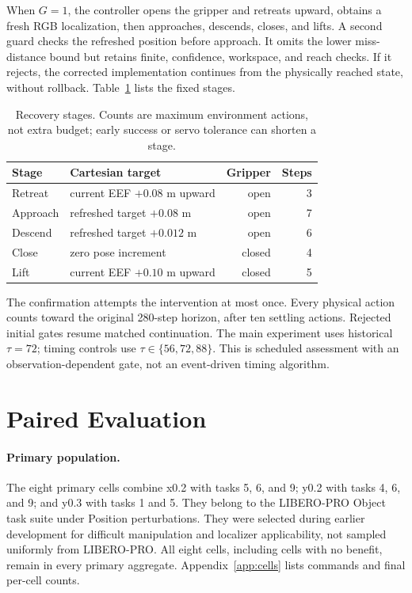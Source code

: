 \documentclass{article}
\begin{document}
When $G=1$, the controller opens the gripper and retreats upward, obtains
a fresh RGB localization, then approaches, descends, closes, and lifts.
A second guard checks the refreshed position before approach.
It omits the lower miss-distance bound but retains finite, confidence,
workspace, and reach checks. If it rejects, the corrected implementation
continues from the physically reached state, without rollback.
Table~\ref{tab:primitive} lists the fixed stages.

\begin{table}[t]
\caption{Recovery stages. Counts are maximum environment actions, not extra
budget; early success or servo tolerance can shorten a stage.}
\label{tab:primitive}
\centering\small
\begin{tabular}{llrr}
\toprule
Stage & Cartesian target & Gripper & Steps\\
\midrule
Retreat & current EEF $+0.08$ m upward & open & 3\\
Approach & refreshed target $+0.08$ m & open & 7\\
Descend & refreshed target $+0.012$ m & open & 6\\
Close & zero pose increment & closed & 4\\
Lift & current EEF $+0.10$ m upward & closed & 5\\
\bottomrule
\end{tabular}
\end{table}

The confirmation attempts the intervention at most once.
Every physical action counts toward the original 280-step horizon, after
ten settling actions. Rejected initial gates resume matched continuation.
The main experiment uses historical $\tau=72$; timing controls use
$\tau\in\{56,72,88\}$. This is scheduled assessment with an observation-dependent
gate, not an event-driven timing algorithm.

\section{Paired Evaluation}
\label{sec:evaluation}
\paragraph{Primary population.}
The eight primary cells combine x0.2 with tasks 5, 6, and 9;
y0.2 with tasks 4, 6, and 9; and y0.3 with tasks 1 and 5.
They belong to the LIBERO-PRO Object task suite under Position perturbations.
They were selected during earlier development for difficult manipulation and
localizer applicability, not sampled uniformly from LIBERO-PRO.
All eight cells, including cells with no benefit, remain in every primary
aggregate. Appendix~\ref{app:cells} lists commands and final per-cell counts.
\end{document}
